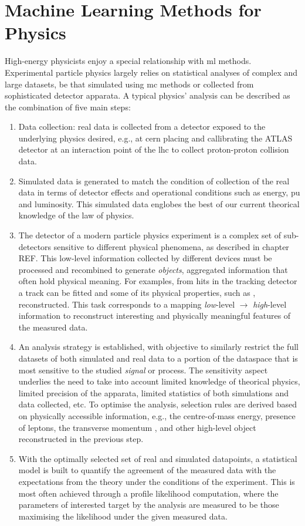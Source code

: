 \section{Machine Learning Methods for Physics}
High-energy physicists enjoy a special relationship with \gls{ml} methods. Experimental particle physics largely relies on statistical analyses of complex and large datasets, be that simulated using \gls{mc} methods or collected from sophisticated detector apparata. A typical physics' analysis can be described as the combination of five main steps:
\begin{enumerate}
    \item Data collection: real data is collected from a detector exposed to the underlying physics desired, e.g., at \gls{cern} placing and callibrating the ATLAS detector at an interaction point of the \gls{lhc} to collect proton-proton collision data. 
    \item Simulated data is generated to match the condition of collection of the real data in terms of detector effects and operational conditions such as energy, \gls{pu} and luminosity. This simulated data englobes the best of our current theorical knowledge of the law of physics. 
    \item The detector of a modern particle physics experiment is a complex set of sub-detectors sensitive to different physical phenomena, as described in chapter REF. %
    This low-level information collected by different devices must be processed and recombined to generate \textit{objects}, aggregated information that often hold physical meaning. For examples, from hits in the tracking detector a track can be fitted and some of its physical properties, such as \pt, reconstructed. This task corresponds to a mapping \textit{low}-level $\rightarrow$ \textit{high}-level information to reconstruct interesting and physically meaningful features of the measured data. 
    \item An analysis strategy is established, with objective to similarly restrict the full datasets of both simulated and real data to a portion of the dataspace that is most sensitive to the studied \textit{signal} or process. The sensitivity aspect underlies the need to take into account limited knowledge of theorical physics, limited precision of the apparata, limited statistics of both simulations and data collected, etc. To optimise the analysis, selection rules are derived based on physically accessible information, e.g., the centre-of-mass energy, presence of leptons, the transverse momentum \pt, and other high-level object reconstructed in the previous step.
    \item With the optimally selected set of real and simulated datapoints, a statistical model is built to quantify the agreement of the measured data with the expectations from the theory under the conditions of the experiment. This is most often achieved through a profile likelihood computation, where the parameters of interested target by the analysis are measured to be those maximising the likelihood under the given measured data.
\end{enumerate}


